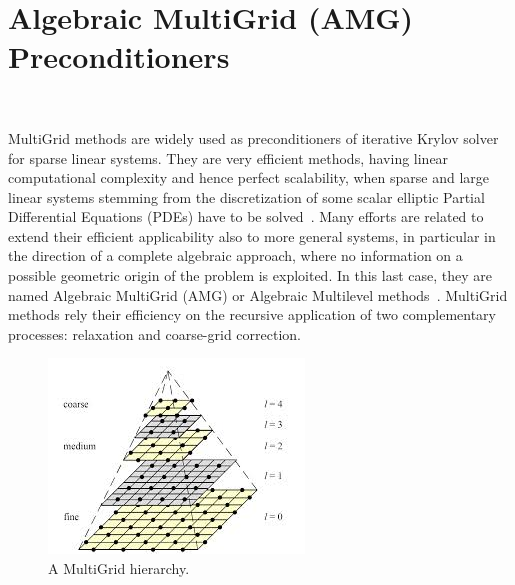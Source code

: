 \section{Algebraic MultiGrid (AMG) Preconditioners}~\label{AMG}
%

MultiGrid methods are widely used as preconditioners of iterative
Krylov solver for sparse linear systems. 
They are very efficient methods, having linear computational
complexity and hence perfect scalability, when 
sparse and large linear systems stemming
from the discretization of some scalar elliptic Partial Differential
Equations (PDEs) have to be solved~\cite{Vassilevski2008}. 
Many efforts are related to extend their efficient applicability also
to more general systems, in particular in the direction of a complete
algebraic approach, where no information on a possible geometric
origin of the problem is exploited. In this last case, they are named
Algebraic MultiGrid (AMG) or Algebraic Multilevel
methods~\cite{Stuben2001}. 
MultiGrid methods rely their efficiency on the recursive application
of two complementary processes: {relaxation and coarse-grid
  correction}. 

\begin{figure}[t]
\begin{center}
\includegraphics[width=.8\textwidth]{multilevel.png}
\caption{A MultiGrid hierarchy.\label{hierarchy}}
\end{center}
\end{figure}


